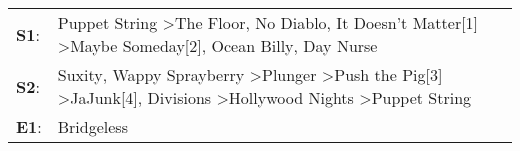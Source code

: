 \begin{supertabular}{p{0.03\textwidth}p{0.92\textwidth}}
 \textbf{S1}:  &                                                                       Puppet String\textsuperscript{} \textgreater \enspace The Floor\textsuperscript{}, \enspace No Diablo\textsuperscript{}, \enspace It Doesn't Matter[1]\textsuperscript{} \textgreater \enspace Maybe Someday[2]\textsuperscript{}, \enspace Ocean Billy\textsuperscript{}, \enspace Day Nurse\textsuperscript{}  \enspace  \\
 \textbf{S2}:  &  Suxity\textsuperscript{}, \enspace Wappy Sprayberry\textsuperscript{} \textgreater \enspace Plunger\textsuperscript{} \textgreater \enspace Push the Pig[3]\textsuperscript{} \textgreater \enspace JaJunk[4]\textsuperscript{}, \enspace Divisions\textsuperscript{} \textgreater \enspace Hollywood Nights\textsuperscript{} \textgreater \enspace Puppet String\textsuperscript{}  \enspace  \\
 \textbf{E1}:  &                                                                                                                                                                                                                                                                                                                                                          Bridgeless\textsuperscript{}  \enspace  \\
\end{supertabular}
